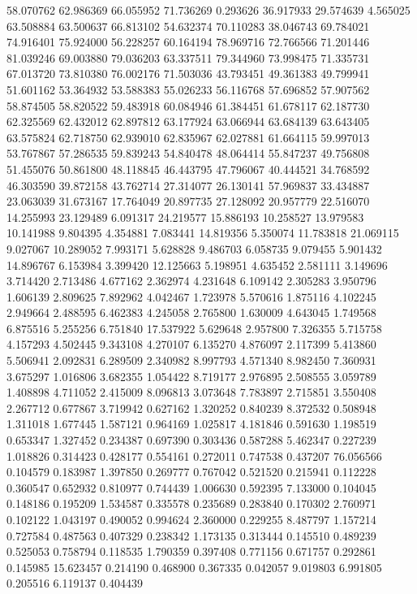58.070762
62.986369
66.055952
71.736269
0.293626
36.917933
29.574639
4.565025
63.508884
63.500637
66.813102
54.632374
70.110283
38.046743
69.784021
74.916401
75.924000
56.228257
60.164194
78.969716
72.766566
71.201446
81.039246
69.003880
79.036203
63.337511
79.344960
73.998475
71.335731
67.013720
73.810380
76.002176
71.503036
43.793451
49.361383
49.799941
51.601162
53.364932
53.588383
55.026233
56.116768
57.696852
57.907562
58.874505
58.820522
59.483918
60.084946
61.384451
61.678117
62.187730
62.325569
62.432012
62.897812
63.177924
63.066944
63.684139
63.643405
63.575824
62.718750
62.939010
62.835967
62.027881
61.664115
59.997013
53.767867
57.286535
59.839243
54.840478
48.064414
55.847237
49.756808
51.455076
50.861800
48.118845
46.443795
47.796067
40.444521
34.768592
46.303590
39.872158
43.762714
27.314077
26.130141
57.969837
33.434887
23.063039
31.673167
17.764049
20.897735
27.128092
20.957779
22.516070
14.255993
23.129489
6.091317
24.219577
15.886193
10.258527
13.979583
10.141988
9.804395
4.354881
7.083441
14.819356
5.350074
11.783818
21.069115
9.027067
10.289052
7.993171
5.628828
9.486703
6.058735
9.079455
5.901432
14.896767
6.153984
3.399420
12.125663
5.198951
4.635452
2.581111
3.149696
3.714420
2.713486
4.677162
2.362974
4.231648
6.109142
2.305283
3.950796
1.606139
2.809625
7.892962
4.042467
1.723978
5.570616
1.875116
4.102245
2.949664
2.488595
6.462383
4.245058
2.765800
1.630009
4.643045
1.749568
6.875516
5.255256
6.751840
17.537922
5.629648
2.957800
7.326355
5.715758
4.157293
4.502445
9.343108
4.270107
6.135270
4.876097
2.117399
5.413860
5.506941
2.092831
6.289509
2.340982
8.997793
4.571340
8.982450
7.360931
3.675297
1.016806
3.682355
1.054422
8.719177
2.976895
2.508555
3.059789
1.408898
4.711052
2.415009
8.096813
3.073648
7.783897
2.715851
3.550408
2.267712
0.677867
3.719942
0.627162
1.320252
0.840239
8.372532
0.508948
1.311018
1.677445
1.587121
0.964169
1.025817
4.181846
0.591630
1.198519
0.653347
1.327452
0.234387
0.697390
0.303436
0.587288
5.462347
0.227239
1.018826
0.314423
0.428177
0.554161
0.272011
0.747538
0.437207
76.056566
0.104579
0.183987
1.397850
0.269777
0.767042
0.521520
0.215941
0.112228
0.360547
0.652932
0.810977
0.744439
1.006630
0.592395
7.133000
0.104045
0.148186
0.195209
1.534587
0.335578
0.235689
0.283840
0.170302
2.760971
0.102122
1.043197
0.490052
0.994624
2.360000
0.229255
8.487797
1.157214
0.727584
0.487563
0.407329
0.238342
1.173135
0.313444
0.145510
0.489239
0.525053
0.758794
0.118535
1.790359
0.397408
0.771156
0.671757
0.292861
0.145985
15.623457
0.214190
0.468900
0.367335
0.042057
9.019803
6.991805
0.205516
6.119137
0.404439
